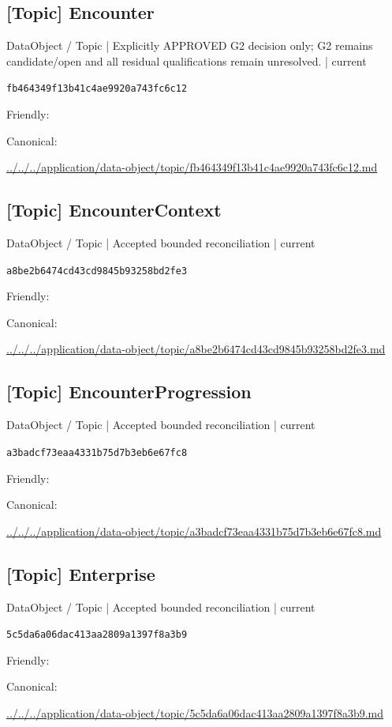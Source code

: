 \documentclass[10pt,a4paper]{article}
\begin{document}
\subsection*{[Topic] Encounter}
{\small DataObject / Topic | Explicitly APPROVED G2 decision only; G2 remains candidate/open and all residual qualifications remain unresolved. | current}\par
\texttt{fb464349f13b41c4ae9920a743fc6c12}\par
Friendly: \par
Canonical: \par
{\footnotesize\url{../../../application/data-object/topic/fb464349f13b41c4ae9920a743fc6c12.md}}\par
\subsection*{[Topic] EncounterContext}
{\small DataObject / Topic | Accepted bounded reconciliation | current}\par
\texttt{a8be2b6474cd43cd9845b93258bd2fe3}\par
Friendly: \par
Canonical: \par
{\footnotesize\url{../../../application/data-object/topic/a8be2b6474cd43cd9845b93258bd2fe3.md}}\par
\subsection*{[Topic] EncounterProgression}
{\small DataObject / Topic | Accepted bounded reconciliation | current}\par
\texttt{a3badcf73eaa4331b75d7b3eb6e67fc8}\par
Friendly: \par
Canonical: \par
{\footnotesize\url{../../../application/data-object/topic/a3badcf73eaa4331b75d7b3eb6e67fc8.md}}\par
\subsection*{[Topic] Enterprise}
{\small DataObject / Topic | Accepted bounded reconciliation | current}\par
\texttt{5c5da6a06dac413aa2809a1397f8a3b9}\par
Friendly: \par
Canonical: \par
{\footnotesize\url{../../../application/data-object/topic/5c5da6a06dac413aa2809a1397f8a3b9.md}}\par
\end{document}
